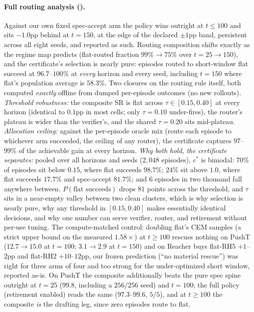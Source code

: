 \documentclass{article}
\begin{document}
\paragraph{Full routing analysis ().}
Against our own fixed spec-accept arm the policy wins outright at $t{\le}100$
and sits $-1.0$pp behind at $t{=}150$, at the edge of the declared $\pm1$pp
band, persistent across all eight seeds, and reported as such. Routing
composition shifts exactly as the regime map predicts (flat-routed fraction
$99\%\to75\%$ over $t{=}25\to150$), and the certificate's selection is nearly
pure: episodes routed to short-window flat succeed at $96.7$--$100\%$ at
\emph{every} horizon and every seed, including $t{=}150$ where flat's
population average is $58.3\%$. Two closures on the routing rule itself, both
computed \emph{exactly} offline from dumped per-episode outcomes (no new
rollouts). \emph{Threshold robustness:} the composite SR is flat across
$\tau\in[0.15,0.40]$ at every horizon (identical to $0.1$pp in most cells;
only $\tau{=}0.10$ under-fires), the router's plateau is wider than the
verifier's, and the shared $\tau{=}0.20$ sits mid-plateau. \emph{Allocation
ceiling:} against the per-episode oracle mix (route each episode to whichever
arm succeeded, the ceiling of any router), the certificate captures
$97$--$99\%$ of the achievable gain at every horizon. \emph{Why both hold, the
certificate separates:} pooled over all horizons and seeds ($2{,}048$
episodes), $c^{*}$ is bimodal: $70\%$ of episodes sit below $0.15$, where flat
succeeds $98.7\%$; $24\%$ sit above $1.0$, where flat succeeds $17.7\%$ and
spec-accept $81.7\%$; and $6$ episodes in two thousand fall anywhere between.
$P(\text{flat succeeds})$ drops $81$ points across the threshold, and $\tau$
sits in a near-empty valley between two clean clusters, which is why selection
is nearly pure, why any threshold in $[0.15,0.40]$ makes essentially identical
decisions, and why one number can serve verifier, router, and retirement
without per-use tuning. The compute-matched control: doubling flat's CEM
samples (a strict upper bound on the measured $1.58\times$) at $t{\ge}100$
rescues nothing on PushT ($12.7{\to}15.0$ at $t{=}100$; $3.1{\to}2.9$ at
$t{=}150$) and on Reacher buys flat-RH5 $+1$--$2$pp and flat-RH2
$+10$--$12$pp, our frozen prediction (``no material rescue'') was right for
three arms of four and too strong for the under-optimized short window,
reported as-is. On PushT the composite additionally beats the pure spec spine
outright at $t{=}25$ ($99.8$, including a $256/256$ seed) and $t{=}100$; the
full policy (retirement enabled) reads the same ($97.3$--$99.6$, $5/5$), and
at $t{\ge}100$ the composite \emph{is} the drafting leg, since zero episodes
route to flat.
\end{document}
